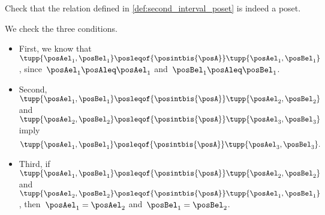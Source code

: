 \begin{exercise}
    Check that the relation defined in \cref{def:second_interval_poset} is indeed a poset.
\end{exercise}
\begin{solution}
    We check the three conditions.
    \begin{itemize}
        \item First, we know that~$\tupp{\posAel_1,\posBel_1}\posleqof{\posintbis{\posA}}\tupp{\posAel_1,\posBel_1}$, since~$\posAel_1\posAleq \posAel_1$ and~$\posBel_1\posAleq \posBel_1$.
        \item Second,~$\tupp{\posAel_1,\posBel_1}\posleqof{\posintbis{\posA}}\tupp{\posAel_2,\posBel_2}$ and~$\tupp{\posAel_2,\posBel_2}\posleqof{\posintbis{\posA}}\tupp{\posAel_3,\posBel_3}$ imply
              \begin{equation}
                  \tupp{\posAel_1,\posBel_1}\posleqof{\posintbis{\posA}}\tupp{\posAel_3,\posBel_3}.
              \end{equation}
        \item Third, if~$\tupp{\posAel_1,\posBel_1}\posleqof{\posintbis{\posA}}\tupp{\posAel_2,\posBel_2}$ and~$\tupp{\posAel_2,\posBel_2}\posleqof{\posintbis{\posA}}\tupp{\posAel_1,\posBel_1}$, then~$\posAel_1=\posAel_2$ and~$\posBel_1=\posBel_2$.
    \end{itemize}
\end{solution}